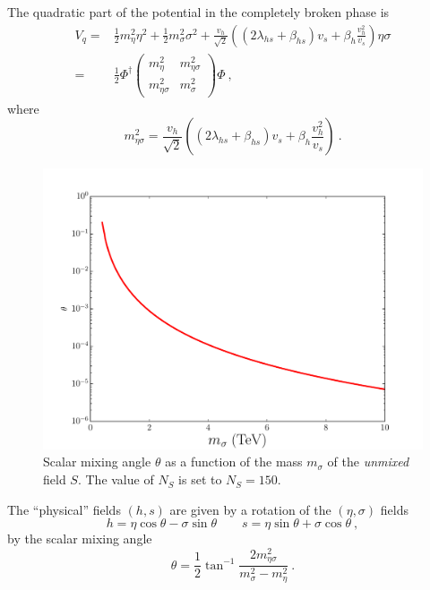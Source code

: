 \documentclass[aps,prd,preprintnumbers,nofootinbibn,twocolumn]{revtex4}
\begin{document}
The quadratic part of the potential in the completely broken phase is
\begin{align}
V_q =& \frac{1}{2} m_\eta^2 \eta^2  + \frac{1}{2} m_\sigma^2 \sigma^2 + \frac{v_h}{\sqrt{2}} \left((2\lambda_{hs} + \beta_{hs})v_s + \beta_h \frac{v_h^2}{v_s} \right) \eta \sigma \nonumber\\
=& \frac{1}{2} \Phi^\dagger \begin{pmatrix} m_\eta^2 & m_{\eta\sigma}^2\\ m_{\eta\sigma}^2  & m_\sigma^2 \end{pmatrix}\Phi\ ,
\end{align}
where
\begin{equation}
m_{\eta\sigma}^2 = \frac{v_h}{\sqrt{2}} \left((2\lambda_{hs} + \beta_{hs})v_s + \beta_h \frac{v_h^2}{v_s} \right)\ .
\end{equation} 

\begin{figure}[t]
\centering
\includegraphics[width=\columnwidth]{angle}
\caption{Scalar mixing angle $\theta$ as a function of the mass $m_\sigma$ of the \textit{unmixed} field $S$. The value of $N_S$ is set to $N_S=150$.}\label{fig:angle}
\end{figure}

The ``physical'' fields $(h, s)$ are given by a rotation of the $(\eta, \sigma)$ fields 
\begin{equation}
h = \eta \cos \theta - \sigma \sin \theta \qquad s = \eta \sin \theta + \sigma \cos \theta\ ,
\end{equation}
by the scalar mixing angle 
\begin{equation}
\theta = \frac{1}{2} \tan^{-1} \frac{2m_{\eta\sigma}^2}{m_\sigma^2 - m_\eta^2}\ .
\end{equation}
\end{document}
